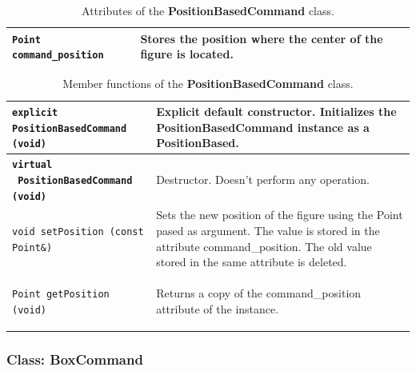 \documentclass[11pt,twoside,openany,x11names,svgnames]{memoir}
\begin{document}
\begin{table}[h]\footnotesize
\centering
\begin{tabular}{| >{\bfseries}p{6.5cm} | p{9cm} |}
	\hline
	
	\texttt{Point command\_position} & Stores the position where the center of the figure is located. \\

	\hline
\end{tabular}
\caption{Attributes of the \textbf{PositionBasedCommand} class.}
\label{tab:PositionBasedCommand-Attributes}
\end{table}

\begin{table}[h]\footnotesize
\centering
\begin{tabular}{| >{\bfseries}p{8.5cm} | p{7cm} |}
	\hline
	
	\texttt{explicit PositionBasedCommand (void)} & Explicit default constructor. Initializes the PositionBasedCommand instance as a PositionBased. \\
	
	\hline
	
	\texttt{virtual ~PositionBasedCommand (void)} & Destructor. Doesn't perform any operation. \\
	
	\hline
	
	\texttt{void setPosition (const Point\&)} & Sets the new position of the figure using the Point pased as argument. The value is stored in the attribute command\_position. The old value stored in the same attribute is deleted. \\
	
	\hline	
	
	\texttt{Point getPosition (void)} & Returns a copy of the command\_position attribute of the instance. \\
	
	\hline
\end{tabular}
\caption{Member functions of the \textbf{PositionBasedCommand} class.}
\label{tab:PositionBasedCommand-MemberFunctions}
\end{table}

\clearpage

\subsubsection{Class: BoxCommand}\label{Class-BoxCommand}
\end{document}
